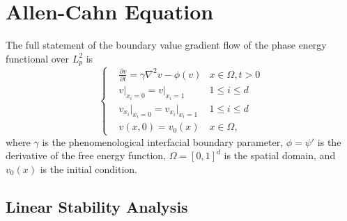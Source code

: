\documentclass[12pt, reqno]{report}
\theoremstyle{definition}
\theoremstyle{remark}
\begin{document}
\section{Allen-Cahn Equation} \label{sec_AC}

The full statement of the boundary value gradient flow of the phase energy functional over $L^2_p$ is
\begin{equation} \label{eq_AC}
    \left\{
        \begin{split}
            &\frac{\partial v}{\partial t}=\gamma\nabla^2v-\phi(v)&x\in\Omega,t>0\\
            &v\big|_{x_i=0}=v\big|_{x_i=1}&1\le i\le d\\
            &v_{x_i}\big|_{x_i=0}=v_{x_i}\big|_{x_i=1}&1\le i\le d\\
            &v(x,0)=v_0(x)&x\in\Omega,
        \end{split}	
    \right.
\end{equation}
where $\gamma$ is the phenomenological interfacial boundary parameter, $\phi=\psi'$ is the derivative of the free energy function, $\Omega=[0,1]^d$ is the spatial domain, and $v_0(x)$ is the initial condition. 

\subsection{Linear Stability Analysis} \label{sssec_linear_AC}
\end{document}
